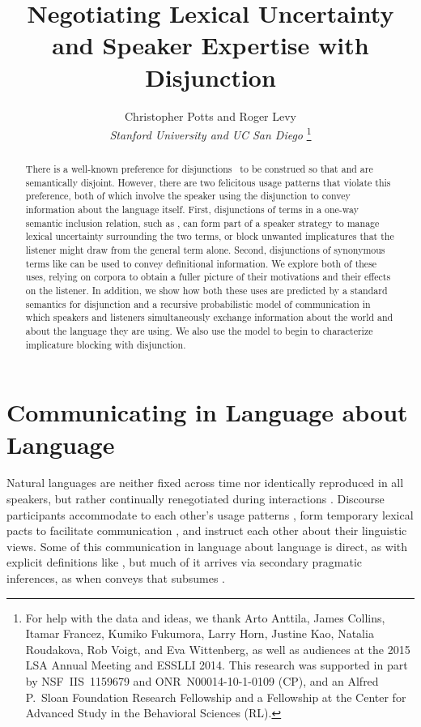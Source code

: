 \documentclass[12pt,twoside]{article}
\title{Negotiating Lexical Uncertainty and Speaker Expertise with Disjunction}				%
\author{\sc Christopher Potts and Roger Levy\\ 						%
{\it Stanford University and UC San Diego}%
\footnote{For help with the data and ideas, we thank %
Arto Anttila, %
James Collins, %
Itamar Francez, %
Kumiko Fukumora, %
Larry Horn, %
Justine Kao, %
Natalia Roudakova, %
Rob Voigt, and %
Eva Wittenberg, %
as well as audiences at the 2015 LSA Annual Meeting and ESSLLI 2014. %
This research was supported in part by NSF~IIS~1159679 and ONR~N00014-10-1-0109 (CP), %
and an Alfred P.~Sloan Foundation Research Fellowship and a Fellowship at the Center for Advanced Study in the Behavioral Sciences (RL).}} %
\date{}
\renewcommand{\_}{\textbf{\textunderscore\hspace{-4pt}\textunderscore\hspace{-3pt}\textunderscore\hspace{-4pt}\textunderscore}\hspace{0.5pt}}			%
\begin{document}
\maketitle
\thispagestyle{empty}	

\newcommand{\XorY}{\word{X\,or\,Y}}
\newcommand{\AorX}{\word{A\,or\,X}}

\begin{abstract}
  There is a well-known preference for disjunctions \XorY\ to be
  construed so that  and  are semantically disjoint.
  However, there are two felicitous usage patterns that violate this
  preference, both of which involve the speaker using the disjunction
  to convey information about the language itself.  First,
  disjunctions of terms in a one-way semantic inclusion relation, such
  as , can form part of a speaker strategy to
  manage lexical uncertainty surrounding the two terms, or block
  unwanted implicatures that the listener might draw from the general
  term alone. Second, disjunctions of synonymous terms like  can be used to convey definitional
  information. We explore both of these uses, relying on corpora to
  obtain a fuller picture of their motivations and their effects on
  the listener. In addition, we show how both these uses are predicted
  by a standard semantics for disjunction and a recursive
  probabilistic model of communication in which speakers and listeners
  simultaneously exchange information about the world and about the
  language they are using.  We also use the model to begin to
  characterize implicature blocking with disjunction.
\end{abstract}
			


\section{Communicating in Language about Language}\label{sec:introduction}

Natural languages are neither fixed across time nor identically
reproduced in all speakers, but rather continually renegotiated during
interactions \citep{Clark97}. Discourse participants accommodate to
each other's usage patterns \citep{Giles:Coupland:Coupland:1991}, form
temporary lexical pacts to facilitate communication
\citep{Clark:Wilkes-Gibbs:1986,Brennan:Clark:1996}, and instruct each
other about their linguistic views. Some of this communication in
language about language is direct, as with explicit definitions like
, but much of it arrives via
secondary pragmatic inferences, as when  conveys
that  subsumes  \citep{Hearst92,SnowEtAl05}.
\end{document}
